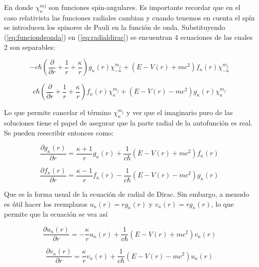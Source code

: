 \documentclass[a4paper, 12pt]{article} %
\begin{document}
En donde $\chi_{\kappa}^{mj}$ son funciones spin-angulares. Es importante
recordar que en el caso relativista las funciones radiales cambian y 
cuando tenemos en cuenta el sp\'in se introducen los spinores de Pauli
en la funci\'on de onda. Substituyendo (\ref{eq:funciondeonda}) en 
(\ref{eq:radialdirac}) se encuentran 4 ecuaciones de las cuales 2 son 
separables:
 

\begin{equation}
-c \hbar  \left( \frac{\partial}{\partial r}+\frac{1}{r}+\frac{\kappa}{r} \right) g_{\kappa}(r)\chi^{m_j}_{-\kappa} +(E-V(r)+mc^2)f_{\kappa}(r)\chi^{m_j}_{-\kappa}
\end{equation}


\begin{equation}
c \hbar  \left( \frac{\partial}{\partial r}+\frac{1}{r}+\frac{\kappa}{r} \right) f_{\kappa}(r)\chi^{m_j}_{\kappa} +(E-V(r)-mc^2)g_{\kappa}(r)\chi^{m_j}_{\kappa}
\end{equation}


Lo que permite cancelar el t\'ermino $\chi^{m_j}_{\kappa}$ y ver que el 
imaginario puro de las soluciones tiene el papel de asegurar que la parte 
radial de la autofunci\'on es real. Se pueden reescribir entonces como:


\begin{equation}
\frac{\partial g_{\kappa}(r)}{\partial r} =\frac{\kappa+1}{r}g_{\kappa}(r)+\frac{1}{c\hbar}(E-V(r)+mc^2)f_{\kappa}(r)
\end{equation}

\begin{equation}
\frac{\partial f_{\kappa}(r)}{\partial r} =\frac{\kappa-1}{r}f_{\kappa}(r)-\frac{1}{c\hbar}(E-V(r)-mc^2)g_{\kappa}(r)
\end{equation}

Que es la forma usual de la ecuaci\'on de radial de Dirac. Sin embargo, a menudo es \'util hacer los reemplazos $u_{\kappa}(r)=rg_{\kappa}(r)$ y $v_{\kappa}(r)=rg_{\kappa}(r)$, lo que permite que la ecuaci\'on se vea as\'i


\begin{equation}\label{eq:rad1}
\frac{\partial u_{\kappa}(r)}{\partial r} =-\frac{\kappa}{r}u_{\kappa}(r)+\frac{1}{c\hbar}(E-V(r)+mc^2)v_{\kappa}(r)
\end{equation}

\begin{equation}\label{eq:rad2}
\frac{\partial v_{\kappa}(r)}{\partial r} =\frac{\kappa}{r}v_{\kappa}(r)+\frac{1}{c\hbar}(E-V(r)-mc^2)u_{\kappa}(r)
\end{equation}
\end{document}
